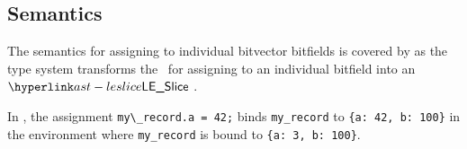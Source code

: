 \begin{mathpar}
\end{mathpar}

\subsection{Semantics}
The semantics for assigning to individual bitvector bitfields is covered by 
as the type system transforms the \untypedast\ for assigning to an individual bitfield into an $\LESlice$ \typedast.


In , the assignment
\verb|my\_record.a = 42;| binds \texttt{my\_record} to \texttt{\{a: 42, b: 100\}}
in the environment where \texttt{my\_record} is bound to \texttt{\{a: 3, b: 100\}}.


